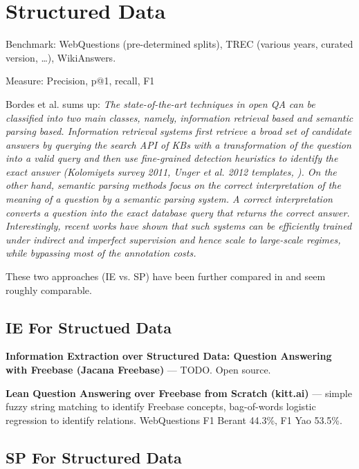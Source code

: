 \section{Structured Data}

Benchmark:  WebQuestions (pre-determined splits), TREC (various years, curated version, \dots), WikiAnswers.

Measure: Precision, p@1, recall, F1

Bordes et al. \cite{Semantic2014Bordes} sums up:
\textit{%
The state-of-the-art techniques in open QA can be classified into two main
classes, namely, information retrieval based and semantic parsing based. Information
retrieval systems first retrieve a broad set of candidate answers by querying
the search API of KBs with a transformation of the question into a valid
query and then use fine-grained detection heuristics to identify the exact answer
(Kolomiyets survey 2011, Unger et al. 2012 templates, \cite{TreeFreebase2014Yao}).
On the other hand, semantic parsing methods focus on the correct
interpretation of the meaning of a question by a semantic parsing system. A
correct interpretation converts a question into the exact database query that
returns the correct answer. Interestingly, recent works \cite{Semantic2013Berant} \cite{SPBerant2014Paraphrase} \cite{OQA} have shown that
such systems can be efficiently trained under indirect and imperfect supervision
and hence scale to large-scale regimes, while bypassing most of the annotation
costs.}

These two approaches (IE vs. SP) have been further compared in \cite{FreebaseQA2014Yao}
and seem roughly comparable.

\subsection{IE For Structued Data}

\textbf{Information Extraction over Structured Data: Question Answering with Freebase (Jacana Freebase)} \cite{TreeFreebase2014Yao}
	--- TODO.
		Open source.

\textbf{Lean Question Answering over Freebase from Scratch (kitt.ai)} \cite{LeanFreebaseYao}
	--- simple fuzzy string matching to identify Freebase concepts,
		bag-of-words logistic regression to identify relations.
		WebQuestions F1 Berant 44.3\%, F1 Yao 53.5\%.

\subsection{SP For Structured Data}

